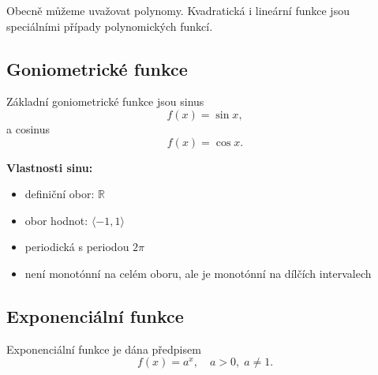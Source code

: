 \documentclass[openany,12pt,a4paper]{book}
\begin{document}
\begin{center}
\end{center}

Obecně můžeme uvažovat polynomy. Kvadratická i lineární funkce jsou speciálními případy polynomických funkcí.

\subsection*{Goniometrické funkce}
\begin{definition}
Základní goniometrické funkce jsou sinus
\[
f(x) = \sin x,
\]
a cosinus
\[
f(x) = \cos x.
\]
\end{definition}

\textbf{Vlastnosti sinu:}
\begin{itemize}
  \item definiční obor: $\mathbb{R}$
  \item obor hodnot: $\langle -1, 1 \rangle$
  \item periodická s periodou $2\pi$
  \item není monotónní na celém oboru, ale je monotónní na dílčích intervalech
\end{itemize}

\begin{center}
\end{center}

\subsection*{Exponenciální funkce}
\begin{definition}
Exponenciální funkce je dána předpisem
\[
f(x) = a^x, \quad a > 0, \; a \neq 1.
\]
\end{definition}
\end{document}
